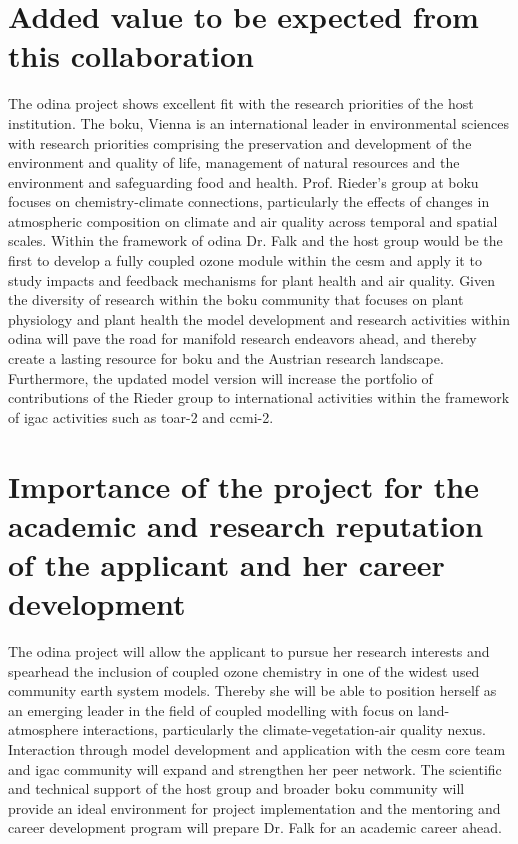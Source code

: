 \section{Added value to be expected from this collaboration}
The \gls{odina} project shows excellent fit with the research priorities of the host institution. The \gls{boku}, Vienna is an international leader in environmental sciences with research priorities comprising the preservation and development of the environment and quality of life, management of natural resources and the environment and safeguarding food and health. Prof. Rieder’s group at \gls{boku} focuses on chemistry-climate connections, particularly the effects of changes in atmospheric composition on climate and air quality across temporal and spatial scales. Within the framework of \gls{odina} Dr. Falk and the host group would be the first to develop a fully coupled ozone module within the \gls{cesm} and apply it to study impacts and feedback mechanisms for plant health and air quality. Given the diversity of research within the \gls{boku} community that focuses on plant physiology and plant health the model development and research activities within \gls{odina} will pave the road for manifold research endeavors ahead, and thereby create a lasting resource for \gls{boku} and the Austrian research landscape. Furthermore, the updated model version will increase the portfolio of contributions of the Rieder group to international activities within the framework of \gls{igac} activities such as \gls{toar}-2 and \gls{ccmi}-2.

\section{Importance of the project for the academic and research reputation of the applicant and her career development}
The \gls{odina} project will allow the applicant to pursue her research interests and spearhead the inclusion of coupled ozone chemistry in one of the widest used community earth system models. Thereby she will be able to position herself as an emerging leader in the field of coupled modelling with focus on land-atmosphere interactions, particularly the climate-vegetation-air quality nexus. Interaction through model development and application with the \gls{cesm} core team and \gls{igac} community will expand and strengthen her peer network. The scientific and technical support of the host group and broader \gls{boku} community will provide an ideal environment for project implementation and the mentoring and career development program will prepare Dr. Falk for an academic career ahead.

